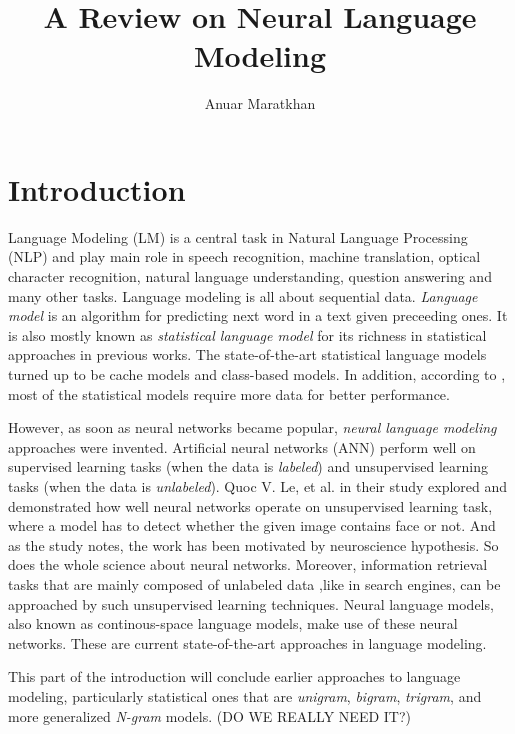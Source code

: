 \documentclass{IEEEtran}
\begin{document}
\title{A Review on Neural Language Modeling}

\author{Anuar Maratkhan}

\maketitle

\section{Introduction}

Language Modeling (LM) is a central task in Natural Language Processing (NLP) and play main role in speech recognition, machine translation, optical character recognition, natural language understanding, question answering and many other tasks. Language modeling is all about sequential data. \textit{Language model} is an algorithm for predicting next word in a text given preceeding ones. It is also mostly known as \textit{statistical language model} for its richness in statistical approaches in previous works. The state-of-the-art statistical language models turned up to be cache models and class-based models. In addition, according to \cite{Mikolov2010NeuralLM}, most of the statistical models require more data for better performance. 

However, as soon as neural networks became popular, \textit{neural language modeling} approaches were invented. Artificial neural networks (ANN) perform well on supervised learning tasks (when the data is \textit{labeled}) and unsupervised learning tasks (when the data is \textit{unlabeled}). Quoc V. Le, et al. in their study \cite{unsupervised} explored and demonstrated how well neural networks operate on unsupervised learning task, where a model has to detect whether the given image contains face or not. And as the study \cite{unsupervised} notes, the work has been motivated by neuroscience hypothesis. So does the whole science about neural networks. Moreover, information retrieval tasks that are mainly composed of unlabeled data ,like in search engines, can be approached by such unsupervised learning techniques. Neural language models, also known as continous-space language models, make use of these neural networks. These are current state-of-the-art approaches in language modeling.

This part of the introduction will conclude earlier approaches to language modeling, particularly statistical ones that are \textit{unigram}, \textit{bigram}, \textit{trigram}, and more generalized \textit{N-gram} models. (DO WE REALLY NEED IT?)
\end{document}
